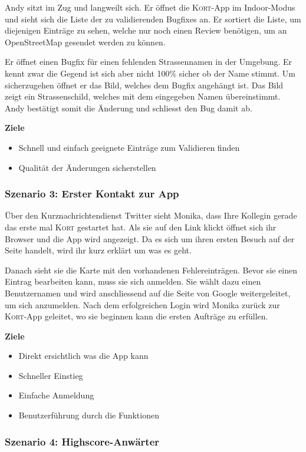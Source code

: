 Andy sitzt im Zug und langweilt sich. Er öffnet die \textsc{Kort}-App im Indoor-Modus und sieht sich die Liste der zu validierenden Bugfixes an. Er sortiert die Liste, um diejenigen Einträge zu sehen, welche nur noch einen Review benötigen, um an \gls{OpenStreetMap} gesendet werden zu können.

Er öffnet einen Bugfix für einen fehlenden Strassennamen in der Umgebung. Er kennt zwar die Gegend ist sich aber nicht 100\% sicher ob der Name stimmt. Um sicherzugehen öffnet er das Bild, welches dem Bugfix angehängt ist. Das Bild zeigt ein Strassenschild, welches mit dem eingegeben Namen übereinstimmt. Andy bestätigt somit die Änderung und schliesst den Bug damit ab.

\textbf{Ziele}
\begin{itemize}
\item Schnell und einfach geeignete Einträge zum Validieren finden
\item Qualität der Änderungen sicherstellen
\end{itemize}

\subsubsection{Szenario 3: Erster Kontakt zur App}

Über den Kurznachrichtendienst Twitter sieht Monika, dass Ihre Kollegin gerade das erste mal \textsc{Kort} gestartet hat.
Als sie auf den Link klickt öffnet sich ihr Browser und die App wird angezeigt.
Da es sich um ihren ersten Besuch auf der Seite handelt, wird ihr kurz erklärt um was es geht.

Danach sieht sie die Karte mit den vorhandenen Fehlereinträgen.
Bevor sie einen Eintrag bearbeiten kann, muss sie sich anmelden.
Sie wählt dazu einen Benutzernamen und wird anschliessend auf die Seite von Google weitergeleitet, um sich anzumelden.
Nach dem erfolgreichen Login wird Monika zurück zur \textsc{Kort}-App geleitet, wo sie beginnen kann die ersten Aufträge zu erfüllen.

\textbf{Ziele}
\begin{itemize}
\item Direkt ersichtlich was die App kann
\item Schneller Einstieg
\item Einfache Anmeldung
\item Benutzerführung durch die Funktionen
\end{itemize}

\subsubsection{Szenario 4: Highscore-Anwärter}

